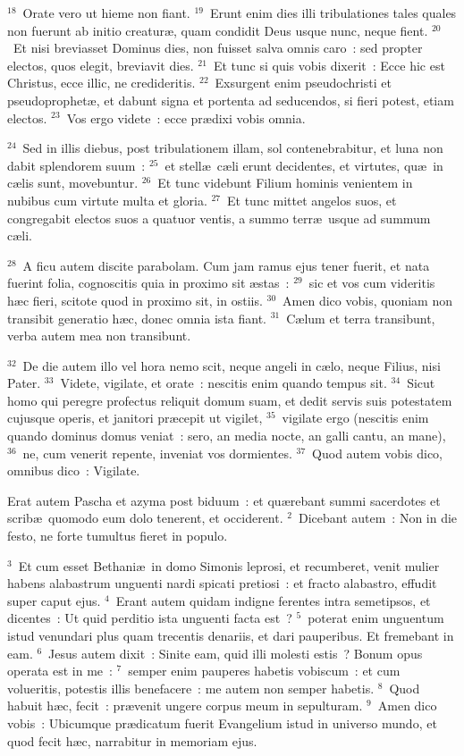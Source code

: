 ${}^{18}$~Orate vero ut hieme non fiant.
${}^{19}$~Erunt enim dies illi tribulationes tales quales non fuerunt ab initio creatur\ae , quam condidit Deus usque nunc, neque fient.
${}^{20}$~Et nisi breviasset Dominus dies, non fuisset salva omnis caro~: sed propter electos, quos elegit, breviavit dies.
${}^{21}$~Et tunc si quis vobis dixerit~: Ecce hic est Christus, ecce illic, ne credideritis.
${}^{22}$~Exsurgent enim pseudochristi et pseudoprophet\ae , et dabunt signa et portenta ad seducendos, si fieri potest, etiam electos.
${}^{23}$~Vos ergo videte~: ecce pr\ae dixi vobis omnia.


${}^{24}$~Sed in illis diebus, post tribulationem illam, sol contenebrabitur, et luna non dabit splendorem suum~:
${}^{25}$~et stell\ae\ c\ae li erunt decidentes, et virtutes, qu\ae\ in c\ae lis sunt, movebuntur.
${}^{26}$~Et tunc videbunt Filium hominis venientem in nubibus cum virtute multa et gloria.
${}^{27}$~Et tunc mittet angelos suos, et congregabit electos suos a quatuor ventis, a summo terr\ae\ usque ad summum c\ae li.


${}^{28}$~A ficu autem discite parabolam. Cum jam ramus ejus tener fuerit, et nata fuerint folia, cognoscitis quia in proximo sit \ae stas~:
${}^{29}$~sic et vos cum videritis h\ae c fieri, scitote quod in proximo sit, in ostiis.
${}^{30}$~Amen dico vobis, quoniam non transibit generatio h\ae c, donec omnia ista fiant.
${}^{31}$~C\ae lum et terra transibunt, verba autem mea non transibunt.


${}^{32}$~De die autem illo vel hora nemo scit, neque angeli in c\ae lo, neque Filius, nisi Pater.
${}^{33}$~Videte, vigilate, et orate~: nescitis enim quando tempus sit.
${}^{34}$~Sicut homo qui peregre profectus reliquit domum suam, et dedit servis suis potestatem cujusque operis, et janitori pr\ae cepit ut vigilet,
${}^{35}$~vigilate ergo (nescitis enim quando dominus domus veniat~: sero, an media nocte, an galli cantu, an mane),
${}^{36}$~ne, cum venerit repente, inveniat vos dormientes.
${}^{37}$~Quod autem vobis dico, omnibus dico~: Vigilate.

\lettrine[lines=3,image=true,loversize=0.05,lraise=-0.03]{E}{}rat autem Pascha et azyma post biduum~: et qu\ae rebant summi sacerdotes et scrib\ae\ quomodo eum dolo tenerent, et occiderent.
${}^{2}$~Dicebant autem~: Non in die festo, ne forte tumultus fieret in populo.


${}^{3}$~Et cum esset Bethani\ae\ in domo Simonis leprosi, et recumberet, venit mulier habens alabastrum unguenti nardi spicati pretiosi~: et fracto alabastro, effudit super caput ejus.
${}^{4}$~Erant autem quidam indigne ferentes intra semetipsos, et dicentes~: Ut quid perditio ista unguenti facta est~?
${}^{5}$~poterat enim unguentum istud venundari plus quam trecentis denariis, et dari pauperibus. Et fremebant in eam.
${}^{6}$~Jesus autem dixit~: Sinite eam, quid illi molesti estis~? Bonum opus operata est in me~:
${}^{7}$~semper enim pauperes habetis vobiscum~: et cum volueritis, potestis illis benefacere~: me autem non semper habetis.
${}^{8}$~Quod habuit h\ae c, fecit~: pr\ae venit ungere corpus meum in sepulturam.
${}^{9}$~Amen dico vobis~: Ubicumque pr\ae dicatum fuerit Evangelium istud in universo mundo, et quod fecit h\ae c, narrabitur in memoriam ejus.


